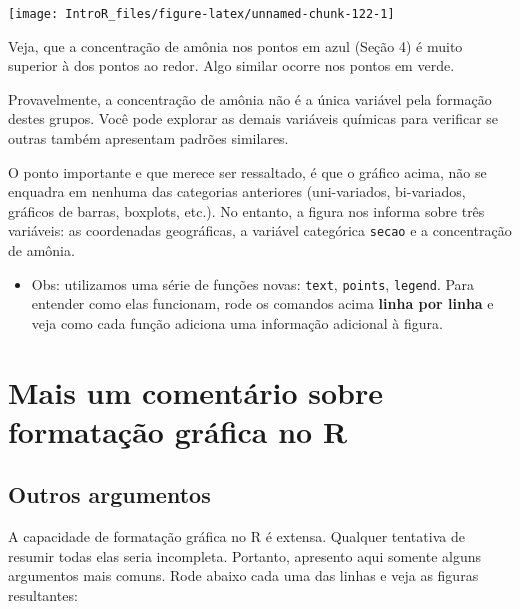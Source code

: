 \documentclass[
]{book}
\providecommand{\tightlist}{%
  \setlength{\itemsep}{0pt}\setlength{\parskip}{0pt}}
\begin{document}
\begin{center}\texttt{[image: IntroR\_files/figure-latex/unnamed-chunk-122-1]} \end{center}

Veja, que a concentração de amônia nos pontos em azul (Seção 4) é muito superior à dos pontos ao redor. Algo similar ocorre nos pontos em verde.

Provavelmente, a concentração de amônia não é a única variável pela formação destes grupos. Você pode explorar as demais variáveis químicas para verificar se outras também apresentam padrões similares.

O ponto importante e que merece ser ressaltado, é que o gráfico acima, não se enquadra em nenhuma das categorias anteriores (uni-variados, bi-variados, gráficos de barras, boxplots, etc.). No entanto, a figura nos informa sobre três variáveis: as coordenadas geográficas, a variável categórica \texttt{secao} e a concentração de amônia.

\begin{itemize}
\tightlist
\item
  Obs: utilizamos uma série de funções novas: \texttt{text}, \texttt{points}, \texttt{legend}. Para entender como elas funcionam, rode os comandos acima \textbf{linha por linha} e veja como cada função adiciona uma informação adicional à figura.
\end{itemize}

\hypertarget{mais-um-comentuxe1rio-sobre-formatauxe7uxe3o-gruxe1fica-no-r}{%
\section{Mais um comentário sobre formatação gráfica no R}\label{mais-um-comentuxe1rio-sobre-formatauxe7uxe3o-gruxe1fica-no-r}}

\hypertarget{outros-argumentos}{%
\subsection{Outros argumentos}\label{outros-argumentos}}

A capacidade de formatação gráfica no R é extensa. Qualquer tentativa de resumir todas elas seria incompleta. Portanto, apresento aqui somente alguns argumentos mais comuns. Rode abaixo cada uma das linhas e veja as figuras resultantes:
\end{document}
